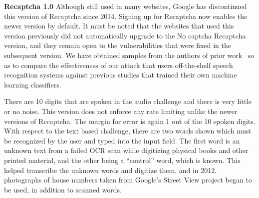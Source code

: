 \textbf{Recaptcha 1.0} Although still used in many websites, Google has discontinued this version of Recaptcha since 2014. 
Signing up for Recaptcha now enables the newer version by default. It must be
noted that the websites that used this version previously did not automatically upgrade to the No 
captcha Recaptcha version, and they remain open to the vulnerabilities that were fixed in the subsequent 
version. We have obtained  samples from the authors of prior work~\cite{meutzner2014using} so as to 
compare the effectiveness of our attack that users off-the-shelf speech recognition systems against previous 
studies that trained their own machine learning classifiers.

There are 10 digits that are spoken in the audio challenge and there is very little or no noise. This 
version does not enforce any rate limiting unlike the newer versions of Recaptcha. The margin for error 
is again 1 out of the 10 spoken digits. With respect to the text based challenge, there are two words 
shown which must be recognized by the user and typed into the input field. The first word is an unknown 
text from a failed OCR scan while digitizing physical books and other printed material, and the other 
being a ``control'' word, which is known. This helped transcribe the unknown words and digitize them, and 
in 2012, photographs of house numbers taken from Google's Street View project began to be used, in 
addition to scanned words. 

